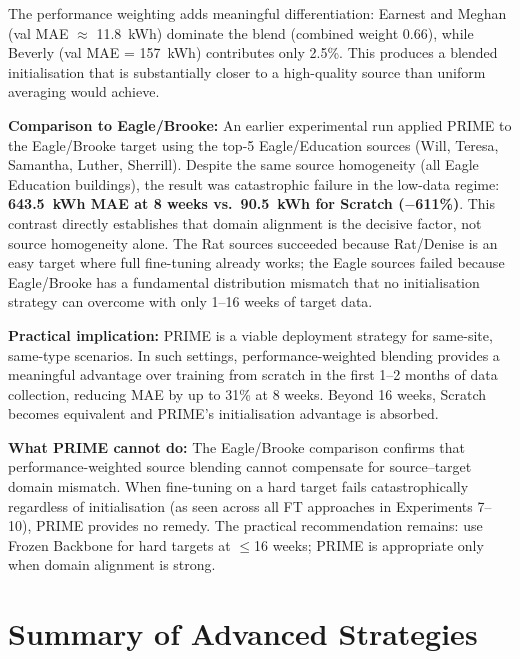 \documentclass[12pt,a4paper]{report}
\begin{document}
The performance weighting adds meaningful differentiation: Earnest and Meghan (val MAE $\approx$ 11.8~kWh) dominate the blend (combined weight 0.66), while Beverly (val MAE = 157~kWh) contributes only 2.5\%. This produces a blended initialisation that is substantially closer to a high-quality source than uniform averaging would achieve.

\textbf{Comparison to Eagle/Brooke:} An earlier experimental run applied PRIME to the Eagle/Brooke target using the top-5 Eagle/Education sources (Will, Teresa, Samantha, Luther, Sherrill). Despite the same source homogeneity (all Eagle Education buildings), the result was catastrophic failure in the low-data regime: \textbf{643.5~kWh MAE at 8 weeks vs.\ 90.5~kWh for Scratch ($-$611\%)}. This contrast directly establishes that domain alignment is the decisive factor, not source homogeneity alone. The Rat sources succeeded because Rat/Denise is an easy target where full fine-tuning already works; the Eagle sources failed because Eagle/Brooke has a fundamental distribution mismatch that no initialisation strategy can overcome with only 1--16 weeks of target data.

\textbf{Practical implication:} PRIME is a viable deployment strategy for same-site, same-type scenarios. In such settings, performance-weighted blending provides a meaningful advantage over training from scratch in the first 1--2 months of data collection, reducing MAE by up to 31\% at 8 weeks. Beyond 16 weeks, Scratch becomes equivalent and PRIME's initialisation advantage is absorbed.

\textbf{What PRIME cannot do:} The Eagle/Brooke comparison confirms that performance-weighted source blending cannot compensate for source--target domain mismatch. When fine-tuning on a hard target fails catastrophically regardless of initialisation (as seen across all FT approaches in Experiments 7--10), PRIME provides no remedy. The practical recommendation remains: use Frozen Backbone for hard targets at $\leq$16 weeks; PRIME is appropriate only when domain alignment is strong.

\section{Summary of Advanced Strategies}
\end{document}
